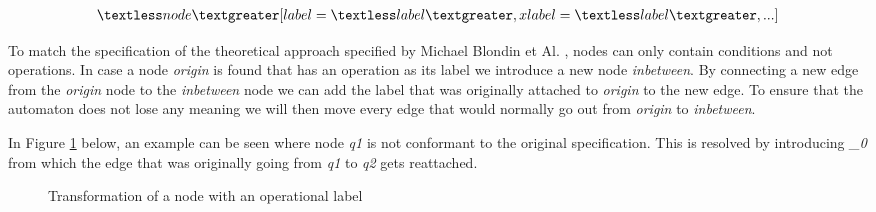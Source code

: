 \documentclass[12pt]{article}
\begin{document}
\begin{gather*}
\textless node \textgreater [label=\textless label\textgreater, xlabel=\textless label\textgreater, ...]
\end{gather*}

To match the specification of the theoretical approach specified by Michael Blondin et Al. \cite{blondin2021continuous}, nodes can only contain conditions and not operations. In case a node \textit{origin} is found that has an operation as its label we introduce a new node \textit{inbetween}. By connecting a new edge from the \textit{origin} node to the \textit{inbetween} node we can add the label that was originally attached to \textit{origin} to the new edge. To ensure that the automaton does not lose any meaning we will then move every edge that would normally go out from \textit{origin} to \textit{inbetween}.

In Figure \ref{fig:nodetransformlabel} below, an example can be seen where node \textit{q1} is not conformant to the original specification. This is resolved by introducing \textit{\_0} from which the edge that was originally going from \textit{q1} to \textit{q2} gets reattached.

\begin{figure}[h]%
	\centering
	\qquad
	\caption{Transformation of a node with an operational label}
	\label{fig:nodetransformlabel}
\end{figure}
\end{document}
